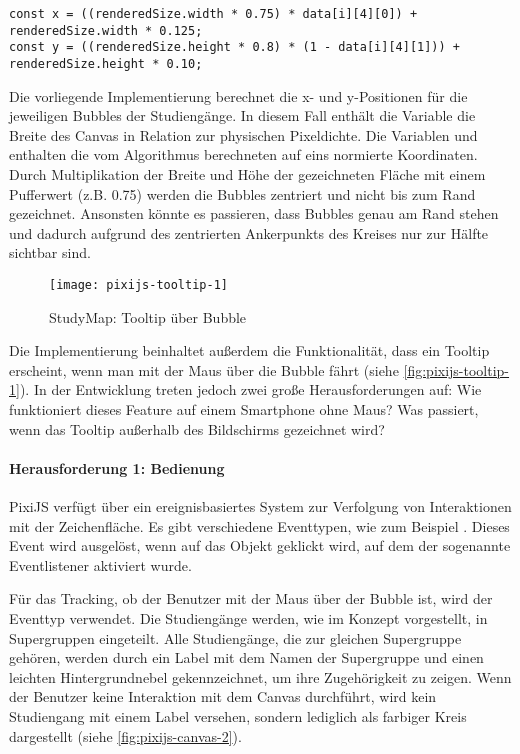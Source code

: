 \begin{lstlisting}[style=Python]
const x = ((renderedSize.width * 0.75) * data[i][4][0]) + renderedSize.width * 0.125;
const y = ((renderedSize.height * 0.8) * (1 - data[i][4][1])) + renderedSize.height * 0.10;
\end{lstlisting}

Die vorliegende Implementierung berechnet die x- und y-Positionen für die jeweiligen Bubbles der Studiengänge. In diesem Fall enthält die Variable  die Breite des Canvas in Relation zur physischen Pixeldichte. Die Variablen  und  enthalten die vom Algorithmus berechneten auf eins normierte Koordinaten. Durch Multiplikation der Breite und Höhe der gezeichneten Fläche mit einem Pufferwert (z.B. 0.75) werden die Bubbles zentriert und nicht bis zum Rand gezeichnet. Ansonsten könnte es passieren, dass Bubbles genau am Rand stehen und dadurch aufgrund des zentrierten Ankerpunkts des Kreises nur zur Hälfte sichtbar sind.

\begin{figure}[H]
    \centering
    \texttt{[image: pixijs-tooltip-1]}
    \caption{StudyMap: Tooltip über Bubble}
    \label{fig:pixijs-tooltip-1}
\end{figure}

Die Implementierung beinhaltet außerdem die Funktionalität, dass ein Tooltip erscheint, wenn man mit der Maus über die Bubble fährt (siehe \autoref{fig:pixijs-tooltip-1}). In der Entwicklung treten jedoch zwei große Herausforderungen auf: Wie funktioniert dieses Feature auf einem Smartphone ohne Maus? Was passiert, wenn das Tooltip außerhalb des Bildschirms gezeichnet wird?

\paragraph*{Herausforderung 1: Bedienung}
PixiJS verfügt über ein ereignisbasiertes System zur Verfolgung von Interaktionen mit der Zeichenfläche. Es gibt verschiedene Eventtypen, wie zum Beispiel . Dieses Event wird ausgelöst, wenn auf das Objekt geklickt wird, auf dem der sogenannte Eventlistener aktiviert wurde. \parencite{pixijs_interaction_2024}

Für das Tracking, ob der Benutzer mit der Maus über der Bubble ist, wird der Eventtyp  verwendet. Die Studiengänge werden, wie im Konzept vorgestellt, in Supergruppen eingeteilt. Alle Studiengänge, die zur gleichen Supergruppe gehören, werden durch ein Label mit dem Namen der Supergruppe und einen leichten Hintergrundnebel gekennzeichnet, um ihre Zugehörigkeit zu zeigen. Wenn der Benutzer keine Interaktion mit dem Canvas durchführt, wird kein Studiengang mit einem Label versehen, sondern lediglich als farbiger Kreis dargestellt (siehe \autoref{fig:pixijs-canvas-2}).

